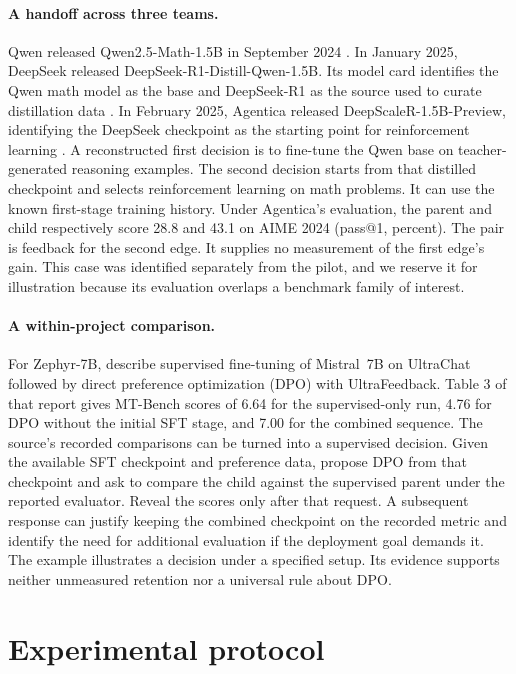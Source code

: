\documentclass{article}
\begin{document}
\paragraph{A handoff across three teams.}
Qwen released Qwen2.5-Math-1.5B in September 2024 \citep{qwen2024math}. In January 2025, DeepSeek released DeepSeek-R1-Distill-Qwen-1.5B. Its model card identifies the Qwen math model as the base and DeepSeek-R1 as the source used to curate distillation data \citep{deepseek2025card}. In February 2025, Agentica released DeepScaleR-1.5B-Preview, identifying the DeepSeek checkpoint as the starting point for reinforcement learning \citep{agentica2025deepscaler}. A reconstructed first decision is to fine-tune the Qwen base on teacher-generated reasoning examples. The second decision starts from that distilled checkpoint and selects reinforcement learning on math problems. It can use the known first-stage training history. Under Agentica's evaluation, the parent and child respectively score 28.8 and 43.1 on AIME 2024 (pass@1, percent). The pair is feedback for the second edge. It supplies no measurement of the first edge's gain. This case was identified separately from the pilot, and we reserve it for illustration because its evaluation overlaps a benchmark family of interest.

\paragraph{A within-project comparison.}
For Zephyr-7B, \citet{tunstall2023zephyr} describe supervised fine-tuning of Mistral~7B on UltraChat followed by direct preference optimization (DPO) with UltraFeedback. Table 3 of that report gives MT-Bench scores of 6.64 for the supervised-only run, 4.76 for DPO without the initial SFT stage, and 7.00 for the combined sequence. The source's recorded comparisons can be turned into a supervised decision. Given the available SFT checkpoint and preference data, propose DPO from that checkpoint and ask to compare the child against the supervised parent under the reported evaluator. Reveal the scores only after that request. A subsequent response can justify keeping the combined checkpoint on the recorded metric and identify the need for additional evaluation if the deployment goal demands it. The example illustrates a decision under a specified setup. Its evidence supports neither unmeasured retention nor a universal rule about DPO.

\section{Experimental protocol}
\label{sec:experiments}
\end{document}
